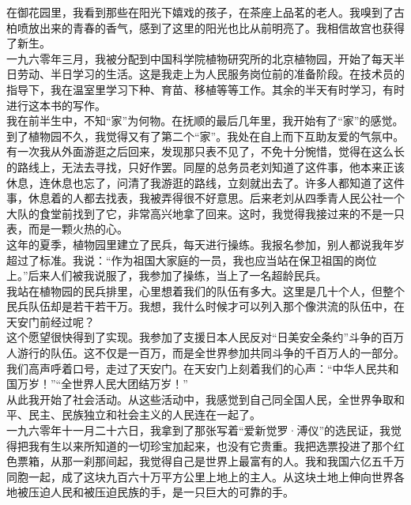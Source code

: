 在御花园里，我看到那些在阳光下嬉戏的孩子，在茶座上品茗的老人。我嗅到了古柏喷放出来的青春的香气，感到了这里的阳光也比从前明亮了。我相信故宫也获得了新生。\\

一九六零年三月，我被分配到中国科学院植物研究所的北京植物园，开始了每天半日劳动、半日学习的生活。这是我走上为人民服务岗位前的准备阶段。在技术员的指导下，我在温室里学习下种、育苗、移植等等工作。其余的半天有时学习，有时进行这本书的写作。\\

我在前半生中，不知“家”为何物。在抚顺的最后几年里，我开始有了“家”的感觉。到了植物园不久，我觉得又有了第二个“家”。我处在自上而下互助友爱的气氛中。有一次我从外面游逛之后回来，发现那只表不见了，不免十分惋惜，觉得在这么长的路线上，无法去寻找，只好作罢。同屋的总务员老刘知道了这件事，他本来正该休息，连休息也忘了，问清了我游逛的路线，立刻就出去了。许多人都知道了这件事，休息着的人都去找表，我被弄得很不好意思。后来老刘从四季青人民公社一个大队的食堂前找到了它，非常高兴地拿了回来。这时，我觉得我接过来的不是一只表，而是一颗火热的心。\\

这年的夏季，植物园里建立了民兵，每天进行操练。我报名参加，别人都说我年岁超过了标准。我说：“作为祖国大家庭的一员，我也应当站在保卫祖国的岗位上。”后来人们被我说服了，我参加了操练，当上了一名超龄民兵。\\

我站在植物园的民兵排里，心里想着我们的队伍有多大。这里是几十个人，但整个民兵队伍却是若干若干万。我想，我什么时候才可以列入那个像洪流的队伍中，在天安门前经过呢？\\

这个愿望很快得到了实现。我参加了支援日本人民反对“日美安全条约”斗争的百万人游行的队伍。这不仅是一百万，而是全世界参加共同斗争的千百万人的一部分。我们高声呼着口号，走过了天安门。在天安门上刻着我们的心声：“中华人民共和国万岁！”“全世界人民大团结万岁！”\\

从此我开始了社会活动。从这些活动中，我感觉到自己同全国人民，全世界争取和平、民主、民族独立和社会主义的人民连在一起了。\\

一九六零年十一月二十六日，我拿到了那张写着“爱新觉罗·溥仪”的选民证，我觉得把我有生以来所知道的一切珍宝加起来，也没有它贵重。我把选票投进了那个红色票箱，从那一刹那间起，我觉得自己是世界上最富有的人。我和我国六亿五千万同胞一起，成了这块九百六十万平方公里上地上的主人。从这块土地上伸向世界各地被压迫人民和被压迫民族的手，是一只巨大的可靠的手。\\

